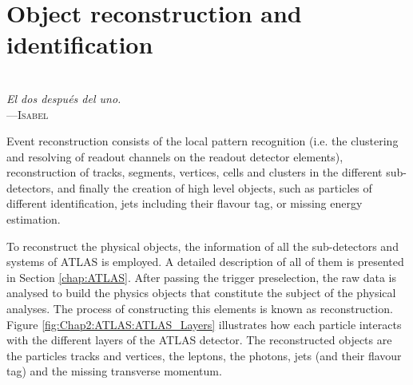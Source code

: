 \begin{comment}
%
%
asdf
\end{comment}




\chapter{Object reconstruction and identification}

\label{chap:ObjectReconstuction}

\vspace*{0.1 cm} 
\hspace*{200pt} \\
\hspace*{175pt} \textit{El dos después del uno.} \\
\hspace*{175pt} ---\textsc{Isabel }\\%
\vspace*{2cm} 


Event reconstruction consists of the local pattern recognition (i.e. the
clustering and resolving of readout channels on the readout detector
elements), reconstruction of tracks, segments, vertices, cells and clusters in the
different sub-detectors, and finally the creation of high level objects, such as
particles of different identification, jets including their flavour tag, or missing
energy estimation.

To reconstruct the physical objects, the information of all the sub-detectors and systems of ATLAS is employed.
A detailed description of all of them is presented in Section \ref{chap:ATLAS}. 
After passing the trigger preselection, the raw data is analysed to build the physics objects that constitute the
subject of the physical analyses. The process of constructing this elements is known as reconstruction.
Figure \ref{fig:Chap2:ATLAS:ATLAS_Layers} illustrates how each particle interacts with the different layers of 
the ATLAS detector. 
The reconstructed objects are the particles tracks and vertices, the leptons, the photons, jets (and their flavour tag) 
and the missing transverse momentum.

